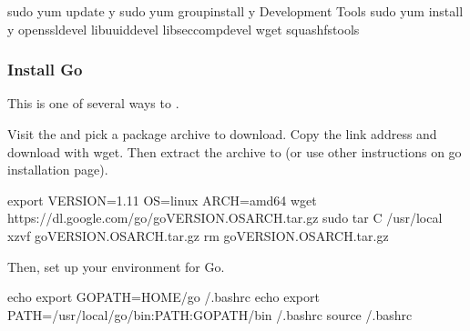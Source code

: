\documentclass[letterpaper,10pt,english]{sphinxmanual}
\begin{document}

%
\begin{sphinxVerbatim}[commandchars=\\\{\}]
\PYGZdl{} sudo yum update \PYGZhy{}y \PYGZam{}\PYGZam{} \PYGZbs{}
    sudo yum groupinstall \PYGZhy{}y \PYGZsq{}Development Tools\PYGZsq{} \PYGZam{}\PYGZam{} \PYGZbs{}
    sudo yum install \PYGZhy{}y \PYGZbs{}
    openssl\PYGZhy{}devel \PYGZbs{}
    libuuid\PYGZhy{}devel \PYGZbs{}
    libseccomp\PYGZhy{}devel \PYGZbs{}
    wget \PYGZbs{}
    squashfs\PYGZhy{}tools
\end{sphinxVerbatim}


\subsubsection{Install Go}
\label{\detokenize{installation:install-go}}\label{\detokenize{installation:id3}}
This is one of several ways to .

Visit the  and pick a package
archive to download. Copy the link address and download with wget.  Then extract
the archive to  (or use other instructions on go installation
page).

%
\begin{sphinxVerbatim}[commandchars=\\\{\}]
\PYGZdl{} export VERSION=1.11 OS=linux ARCH=amd64 \PYGZam{}\PYGZam{} \PYGZbs{}
    wget https://dl.google.com/go/go\PYGZdl{}VERSION.\PYGZdl{}OS\PYGZhy{}\PYGZdl{}ARCH.tar.gz \PYGZam{}\PYGZam{} \PYGZbs{}
    sudo tar \PYGZhy{}C /usr/local \PYGZhy{}xzvf go\PYGZdl{}VERSION.\PYGZdl{}OS\PYGZhy{}\PYGZdl{}ARCH.tar.gz \PYGZam{}\PYGZam{} \PYGZbs{}
    rm go\PYGZdl{}VERSION.\PYGZdl{}OS\PYGZhy{}\PYGZdl{}ARCH.tar.gz
\end{sphinxVerbatim}

Then, set up your environment for Go.

%
\begin{sphinxVerbatim}[commandchars=\\\{\}]
\PYGZdl{} echo \PYGZsq{}export GOPATH=\PYGZdl{}\PYGZob{}HOME\PYGZcb{}/go\PYGZsq{} \PYGZgt{}\PYGZgt{} \PYGZti{}/.bashrc \PYGZam{}\PYGZam{} \PYGZbs{}
    echo \PYGZsq{}export PATH=/usr/local/go/bin:\PYGZdl{}\PYGZob{}PATH\PYGZcb{}:\PYGZdl{}\PYGZob{}GOPATH\PYGZcb{}/bin\PYGZsq{} \PYGZgt{}\PYGZgt{} \PYGZti{}/.bashrc \PYGZam{}\PYGZam{} \PYGZbs{}
    source \PYGZti{}/.bashrc
\end{sphinxVerbatim}
\end{document}

